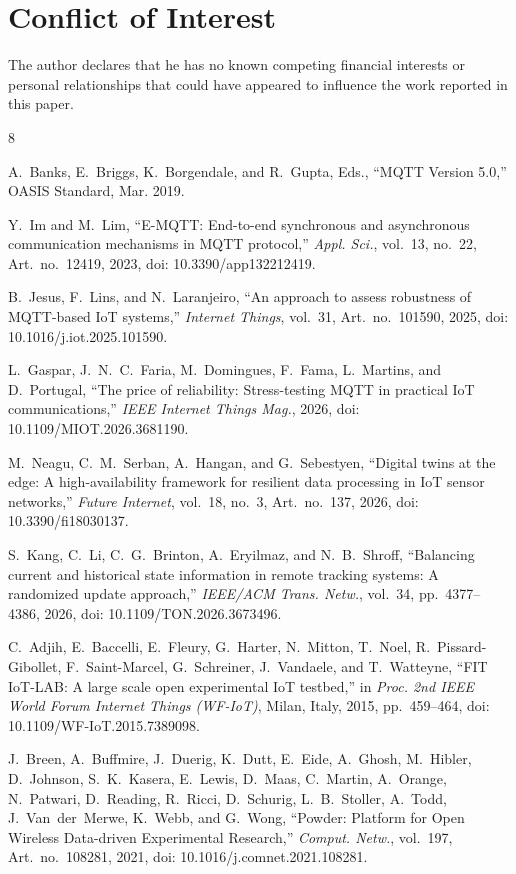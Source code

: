 \documentclass[journal]{IEEEtran}
\begin{document}
\section*{Conflict of Interest}
The author declares that he has no known competing financial interests or personal relationships that could have appeared to influence the work reported in this paper.
\begin{thebibliography}{8}

A.~Banks, E.~Briggs, K.~Borgendale, and R.~Gupta, Eds.,
``MQTT Version 5.0,'' OASIS Standard, Mar. 2019.

Y.~Im and M.~Lim,
``E-MQTT: End-to-end synchronous and asynchronous communication mechanisms in MQTT protocol,''
\emph{Appl. Sci.}, vol.~13, no.~22, Art.~no.~12419, 2023,
doi: 10.3390/app132212419.

B.~Jesus, F.~Lins, and N.~Laranjeiro,
``An approach to assess robustness of MQTT-based IoT systems,''
\emph{Internet Things}, vol.~31, Art.~no.~101590, 2025,
doi: 10.1016/j.iot.2025.101590.

L.~Gaspar, J.~N.~C.~Faria, M.~Domingues, F.~Fama, L.~Martins, and D.~Portugal,
``The price of reliability: Stress-testing MQTT in practical IoT communications,''
\emph{IEEE Internet Things Mag.}, 2026,
doi: 10.1109/MIOT.2026.3681190.

M.~Neagu, C.~M.~Serban, A.~Hangan, and G.~Sebestyen,
``Digital twins at the edge: A high-availability framework for resilient data processing in IoT sensor networks,''
\emph{Future Internet}, vol.~18, no.~3, Art.~no.~137, 2026,
doi: 10.3390/fi18030137.

S.~Kang, C.~Li, C.~G.~Brinton, A.~Eryilmaz, and N.~B.~Shroff,
``Balancing current and historical state information in remote tracking systems: A randomized update approach,''
\emph{IEEE/ACM Trans. Netw.}, vol.~34, pp.~4377--4386, 2026,
doi: 10.1109/TON.2026.3673496.

C.~Adjih, E.~Baccelli, E.~Fleury, G.~Harter, N.~Mitton, T.~Noel, R.~Pissard-Gibollet, F.~Saint-Marcel, G.~Schreiner, J.~Vandaele, and T.~Watteyne,
``FIT IoT-LAB: A large scale open experimental IoT testbed,''
in \emph{Proc. 2nd IEEE World Forum Internet Things (WF-IoT)}, Milan, Italy, 2015, pp.~459--464,
doi: 10.1109/WF-IoT.2015.7389098.

J.~Breen, A.~Buffmire, J.~Duerig, K.~Dutt, E.~Eide, A.~Ghosh, M.~Hibler, D.~Johnson, S.~K.~Kasera, E.~Lewis, D.~Maas, C.~Martin, A.~Orange, N.~Patwari, D.~Reading, R.~Ricci, D.~Schurig, L.~B.~Stoller, A.~Todd, J.~Van~der~Merwe, K.~Webb, and G.~Wong,
``Powder: Platform for Open Wireless Data-driven Experimental Research,''
\emph{Comput. Netw.}, vol.~197, Art.~no.~108281, 2021,
doi: 10.1016/j.comnet.2021.108281.

\end{thebibliography}
\end{document}
